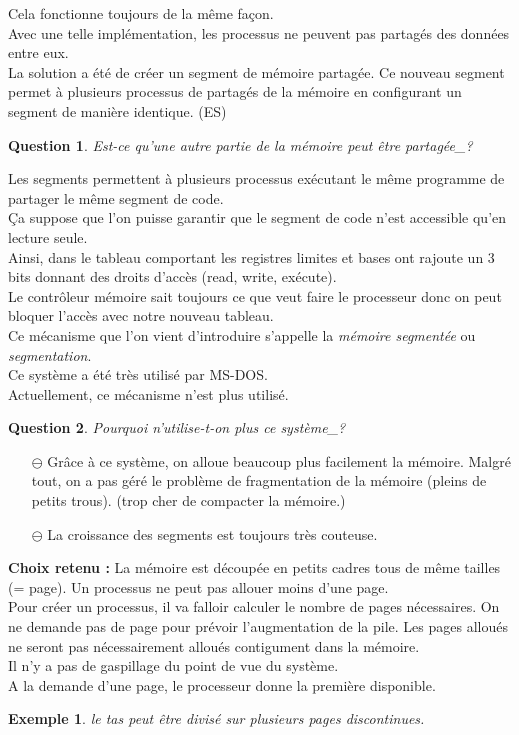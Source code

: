 \documentclass[12pt,a4paper]{report}
\newtheorem*{ex}{Exemple}
\newtheorem*{q}{Question}
\begin{document}
Cela fonctionne toujours de la même façon.\\

Avec une telle implémentation, les processus ne peuvent pas partagés des données entre eux.\\
La solution a été de créer un segment de mémoire partagée. Ce nouveau segment permet à plusieurs processus de partagés de la mémoire en configurant un segment de manière identique. (ES)\\

\begin{q}Est-ce qu'une autre partie de la mémoire peut être partagée_?\end{q}
Les segments permettent à plusieurs processus exécutant le même programme de partager le même segment de code.\\
Ça suppose que l'on puisse garantir que le segment de code n'est accessible qu'en lecture seule.\\
Ainsi, dans le tableau comportant les registres limites et bases ont rajoute un 3 bits donnant des droits d'accès (read, write, exécute).\\
Le contrôleur mémoire sait toujours ce que veut faire le processeur donc on peut bloquer l’accès avec notre nouveau tableau.\\


Ce mécanisme que l'on vient d'introduire s'appelle la \emph{mémoire segmentée} ou \emph{segmentation}.\\
Ce système a été très utilisé par MS-DOS.\\

Actuellement, ce mécanisme n'est plus utilisé.\\
\begin{q} Pourquoi n'utilise-t-on plus ce système_?\end{q}
\begin{itemize}
\item[$\ominus$] Grâce à ce système, on alloue beaucoup plus facilement la mémoire. Malgré tout, on a pas géré le problème de fragmentation de la mémoire (pleins de petits trous). (trop cher de compacter la mémoire.)
\item[$\ominus$] La croissance des segments est toujours très couteuse.
\end{itemize}

\textbf{Choix retenu :} La mémoire est découpée en petits cadres tous de même tailles (= page). Un processus ne peut pas allouer moins d'une page.\\
Pour créer un processus, il va falloir calculer le nombre de pages nécessaires. On ne demande pas de page pour prévoir l'augmentation de la pile. Les pages alloués ne seront pas nécessairement alloués contigument dans la mémoire.\\
Il n'y a pas de gaspillage du point de vue du système.\\
A la demande d'une page, le processeur donne la première disponible.
\begin{ex} le tas peut être divisé sur plusieurs pages discontinues. \end{ex}
\end{document}
